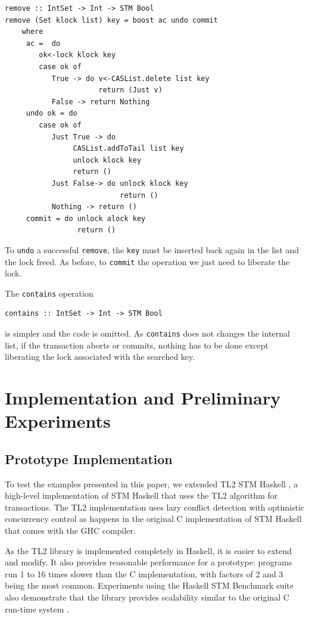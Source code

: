 \documentclass{llncs}
\begin{document}
{\small\begin{verbatim}
remove :: IntSet -> Int -> STM Bool	
remove (Set klock list) key = boost ac undo commit
    where
     ac =  do 
        ok<-lock klock key
        case ok of
           True -> do v<-CASList.delete list key
                      return (Just v)
           False -> return Nothing
     undo ok = do
        case ok of
           Just True -> do
                CASList.addToTail list key				
                unlock klock key
                return ()
           Just False-> do unlock klock key
                           return ()
           Nothing -> return ()
     commit = do unlock alock key
                 return ()
\end{verbatim}}

To {\tt undo} a successful {\tt remove}, the {\tt key} must be inserted back again in the list and the lock
freed. As before, to {\tt commit} the operation we just need to liberate the lock.

The {\tt contains} operation 
{\small\begin{verbatim}
contains :: IntSet -> Int -> STM Bool	
\end{verbatim}}
is simpler and the code is omitted. As {\tt contains} does not changes the internal list, if the transaction aborts or commits, nothing has to be done except liberating the lock associated
with the searched key.

\section{Implementation and Preliminary Experiments}
\label{sec:experiments}
\subsection{Prototype Implementation}

To test the examples presented in this paper, we extended TL2 STM Haskell \cite{paper:tl2stmhaskell,tl2stmhaskell}, a high-level implementation of STM Haskell that uses the TL2 \cite{tl2} algorithm
for transactions. The TL2 implementation uses lazy conflict detection with optimistic concurrency control as happens in 
the original C implementation of STM Haskell that comes with the GHC compiler\cite{smtphaskell}.

As the TL2 library is implemented completely in Haskell, it is easier to extend and modify. It also
provides reasonable performance for a prototype: programs run 1 to 16 times slower than the C implementation, with factors of 2 and 3 being the most common. Experiments using the Haskell STM Benchmark suite also demonstrate that the library provides scalability similar to the
original C run-time system \cite{paper:tl2stmhaskell}.
\end{document}
